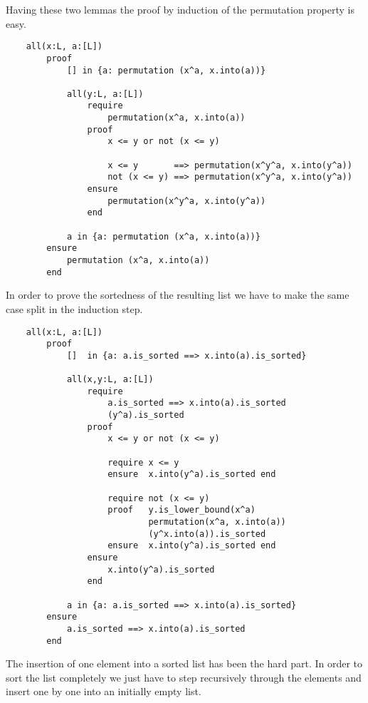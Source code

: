 Having these two lemmas the proof by induction of the permutation property is
easy.

\begin{lstlisting}
    all(x:L, a:[L])
        proof
            [] in {a: permutation (x^a, x.into(a))}

            all(y:L, a:[L])
                require
                    permutation(x^a, x.into(a))
                proof
                    x <= y or not (x <= y)

                    x <= y       ==> permutation(x^y^a, x.into(y^a))
                    not (x <= y) ==> permutation(x^y^a, x.into(y^a))
                ensure
                    permutation(x^y^a, x.into(y^a))
                end

            a in {a: permutation (x^a, x.into(a))}
        ensure
            permutation (x^a, x.into(a))
        end
\end{lstlisting}

In order to prove the sortedness of the resulting list we have to make the
same case split in the induction step.

\begin{lstlisting}
    all(x:L, a:[L])
        proof
            []  in {a: a.is_sorted ==> x.into(a).is_sorted}

            all(x,y:L, a:[L])
                require
                    a.is_sorted ==> x.into(a).is_sorted
                    (y^a).is_sorted
                proof
                    x <= y or not (x <= y)

                    require x <= y
                    ensure  x.into(y^a).is_sorted end

                    require not (x <= y)
                    proof   y.is_lower_bound(x^a)
                            permutation(x^a, x.into(a))
                            (y^x.into(a)).is_sorted
                    ensure  x.into(y^a).is_sorted end                
                ensure
                    x.into(y^a).is_sorted
                end

            a in {a: a.is_sorted ==> x.into(a).is_sorted}
        ensure
            a.is_sorted ==> x.into(a).is_sorted
        end
\end{lstlisting}

The insertion of one element into a sorted list has been the hard part. In
order to sort the list completely we just have to step recursively through the
elements and insert one by one into an initially empty list.

